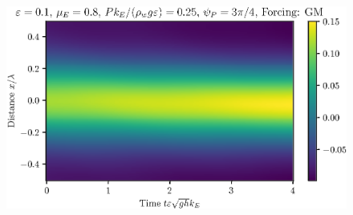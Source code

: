 \documentclass{jfm}
\begin{document}
\begin{figure}
  \centering
  \includegraphics{Spacetime-Mesh_GM.eps}
  \caption{}
\end{figure}
\end{document}
